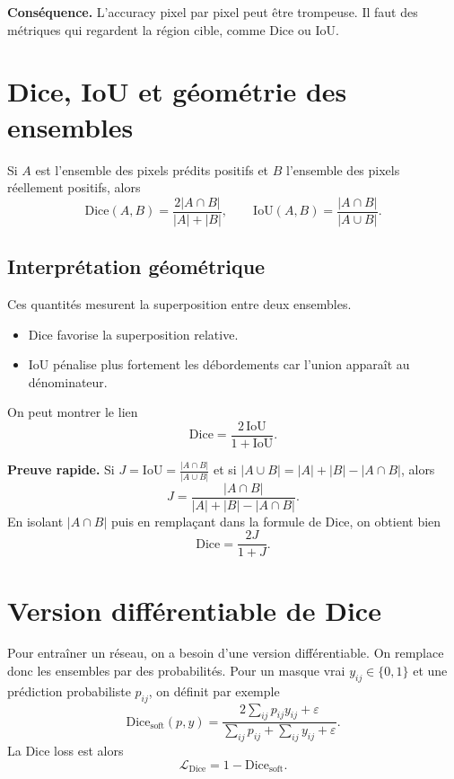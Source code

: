 \documentclass[11pt]{article}
\begin{document}
\begin{warningBox}
\textbf{Conséquence.} L'accuracy pixel par pixel peut être trompeuse. Il faut des métriques qui regardent la région cible, comme Dice ou IoU.
\end{warningBox}

\section{Dice, IoU et géométrie des ensembles}
Si $A$ est l'ensemble des pixels prédits positifs et $B$ l'ensemble des pixels réellement positifs, alors
\[
\mathrm{Dice}(A,B)=\frac{2|A\cap B|}{|A|+|B|},
\qquad
\mathrm{IoU}(A,B)=\frac{|A\cap B|}{|A\cup B|}.
\]

\subsection{Interprétation géométrique}
Ces quantités mesurent la superposition entre deux ensembles.

\begin{itemize}
  \item Dice favorise la superposition relative.
  \item IoU pénalise plus fortement les débordements car l'union apparaît au dénominateur.
\end{itemize}

On peut montrer le lien
\[
\mathrm{Dice}=\frac{2\,\mathrm{IoU}}{1+\mathrm{IoU}}.
\]

\begin{mathBox}
\textbf{Preuve rapide.}
Si $J=\mathrm{IoU}=\frac{|A\cap B|}{|A\cup B|}$ et si
$|A\cup B|=|A|+|B|-|A\cap B|$, alors
\[
J=\frac{|A\cap B|}{|A|+|B|-|A\cap B|}.
\]
En isolant $|A\cap B|$ puis en remplaçant dans la formule de Dice, on obtient bien
\[
\mathrm{Dice}=\frac{2J}{1+J}.
\]
\end{mathBox}

\section{Version différentiable de Dice}
Pour entraîner un réseau, on a besoin d'une version différentiable. On remplace donc les ensembles par des probabilités. Pour un masque vrai $y_{ij}\in\{0,1\}$ et une prédiction probabiliste $p_{ij}$, on définit par exemple
\[
\mathrm{Dice}_{\mathrm{soft}}(p,y)=\frac{2\sum_{ij} p_{ij}y_{ij}+\varepsilon}{\sum_{ij} p_{ij}+\sum_{ij} y_{ij}+\varepsilon}.
\]
La Dice loss est alors
\[
\mathcal{L}_{\mathrm{Dice}}=1-\mathrm{Dice}_{\mathrm{soft}}.
\]
\end{document}
